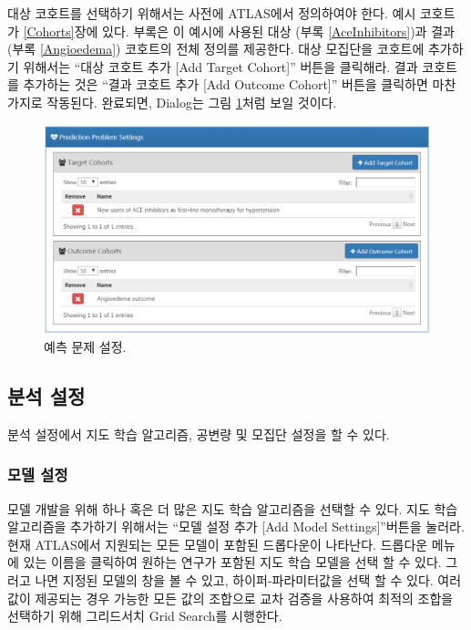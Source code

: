 \documentclass[10.5pt]{book}
\theoremstyle{definition}
\theoremstyle{definition}
\theoremstyle{definition}
\theoremstyle{remark}
\begin{document}
대상 코호트를 선택하기 위해서는 사전에 ATLAS에서 정의하여야 한다. 예시
코호트가 \ref{Cohorts}장에 있다. 부록은 이 예시에 사용된 대상 (부록
\ref{AceInhibitors})과 결과 (부록 \ref{Angioedema}) 코호트의 전체 정의를
제공한다. 대상 모집단을 코호트에 추가하기 위해서는 ``대상 코호트 추가
{[}Add Target Cohort{]}'' 버튼을 클릭해라. 결과 코호트를 추가하는 것은
``결과 코호트 추가 {[}Add Outcome Cohort{]}'' 버튼을 클릭하면 마찬가지로
작동된다. 완료되면, Dialog는 그림 \ref{fig:problemSettings}처럼 보일
것이다.

\begin{figure}

{\centering \includegraphics[width=1\linewidth]{images/PatientLevelPrediction/problemSettings} 

}

\caption{예측 문제 설정.}\label{fig:problemSettings}
\end{figure}

\subsection{분석 설정}\label{-}

분석 설정에서 지도 학습 알고리즘, 공변량 및 모집단 설정을 할 수 있다.

\subsubsection*{모델 설정}\label{-}

모델 개발을 위해 하나 혹은 더 많은 지도 학습 알고리즘을 선택할 수 있다.
지도 학습 알고리즘을 추가하기 위해서는 ``모델 설정 추가 {[}Add Model
Settings{]}''버튼을 눌러라. 현재 ATLAS에서 지원되는 모든 모델이 포함된
드롭다운이 나타난다. 드롭다운 메뉴에 있는 이름을 클릭하여 원하는 연구가
포함된 지도 학습 모델을 선택 할 수 있다. 그러고 나면 지정된 모델의 창을
볼 수 있고, 하이퍼-파라미터값을 선택 할 수 있다. 여러 값이 제공되는 경우
가능한 모든 값의 조합으로 교차 검증을 사용하여 최적의 조합을 선택하기
위해 그리드서치 Grid Search를 시행한다.
\end{document}
